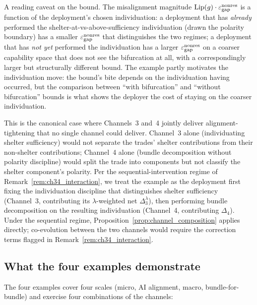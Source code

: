 A reading caveat on the bound.  The misalignment magnitude
$\mathrm{Lip}(g) \cdot \varepsilon_{\mathrm{gap}}^{\mathrm{nonres}}$ is a function of the
deployment's chosen individuation: a deployment that has
\emph{already} performed the shelter-at-vs-above-sufficiency
individuation (drawn the polarity boundary) has a smaller
$\varepsilon_{\mathrm{gap}}^{\mathrm{nonres}}$ that distinguishes the two regimes; a deployment
that has \emph{not yet} performed the individuation has a
larger $\varepsilon_{\mathrm{gap}}^{\mathrm{nonres}}$ on a coarser capability space that does not
see the bifurcation at all, with a correspondingly larger but
structurally different bound.  The example partly motivates
the individuation move: the bound's bite depends on the
individuation having occurred, but the comparison between
``with bifurcation'' and ``without bifurcation'' bounds is what
shows the deployer the cost of staying on the coarser
individuation.

This is the canonical case where Channels~3 and~4 jointly
deliver alignment-tightening that no single channel could
deliver.  Channel~3 alone (individuating shelter sufficiency)
would not separate the trades' shelter contributions from
their non-shelter contributions; Channel~4 alone (bundle
decomposition without polarity discipline) would split the
trade into components but not classify the shelter
component's polarity.  Per the sequential-intervention regime
of Remark~\ref{rem:ch34_interaction}, we treat the example as
the deployment first fixing the individuation discipline that
distinguishes shelter sufficiency (Channel~3, contributing its
$\lambda$-weighted net $\Delta_3^{\lambda}$), then performing
bundle decomposition on the resulting individuation
(Channel~4, contributing $\Delta_4$).  Under the sequential
regime, Proposition~\ref{prop:channel_composition} applies
directly; co-evolution between the two channels would require
the correction terms flagged in
Remark~\ref{rem:ch34_interaction}.

\subsection{What the four examples demonstrate}
\label{sec:wex_summary}

The four examples cover four scales (micro, AI alignment,
macro, bundle-for-bundle) and exercise four combinations of
the channels:


